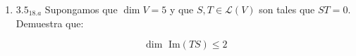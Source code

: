 \documentclass{article}
\begin{document}
		\begin{enumerate}
			
			\item[] \(3.5_{18.a}\) Supongamos que \(\dim V=5\) y que \(S,T \in \mathscr{L}(V)\) son tales que \(ST=0\). Demuestra que:
			
			\begin{equation*}
				\dim\text{ Im}(TS) \leq 2
			\end{equation*}
			
		\end{enumerate}
		
	
\end{document}
